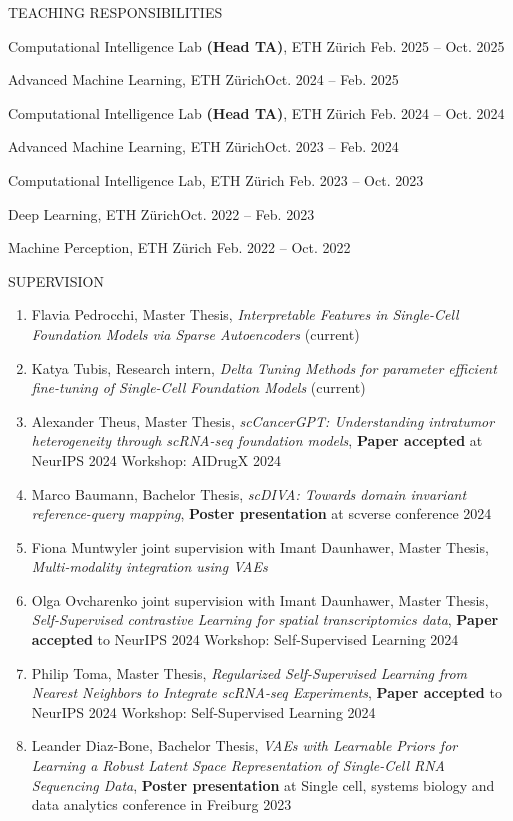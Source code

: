 \documentclass{resume} %
\begin{document}
\begin{rSection}{TEACHING RESPONSIBILITIES}
\vspace{-1.25em}
\item Computational Intelligence Lab \textbf{(Head TA)}, ETH Zürich \hfill {Feb. 2025 -- Oct. 2025}
\item Advanced Machine Learning, ETH Zürich\hfill {Oct. 2024 -- Feb. 2025}
\item Computational Intelligence Lab \textbf{(Head TA)}, ETH Zürich \hfill {Feb. 2024 -- Oct. 2024}
\item Advanced Machine Learning, ETH Zürich\hfill {Oct. 2023 -- Feb. 2024}
\item Computational Intelligence Lab, ETH Zürich \hfill {Feb. 2023 -- Oct. 2023}
\item Deep Learning, ETH Zürich\hfill {Oct. 2022 -- Feb. 2023}
\item Machine Perception, ETH Zürich \hfill {Feb. 2022 -- Oct. 2022}
\end{rSection}
\begin{rSection}{SUPERVISION}
\begin{enumerate}
    \item[2025] Flavia Pedrocchi, Master Thesis, \textit{Interpretable Features in Single-Cell Foundation Models via Sparse Autoencoders} (current)
    \item[2025] Katya Tubis, Research intern, \textit{Delta Tuning Methods for parameter efficient fine-tuning of Single-Cell Foundation Models} (current)
    \item[2024] Alexander Theus, Master Thesis, \textit{scCancerGPT: Understanding intratumor heterogeneity through scRNA-seq foundation models}, \textbf{Paper accepted} at NeurIPS 2024 Workshop: AIDrugX 2024
    \item[2024] Marco Baumann, Bachelor Thesis, \textit{scDIVA: Towards domain invariant reference-query mapping}, \textbf{Poster presentation} at scverse conference 2024
    \item[2024] Fiona Muntwyler joint supervision with Imant Daunhawer, Master Thesis, \textit{Multi-modality integration using VAEs}
    \item[2024] Olga Ovcharenko joint supervision with Imant Daunhawer, Master Thesis, \textit{Self-Supervised contrastive Learning for spatial transcriptomics data}, \textbf{Paper accepted} to NeurIPS 2024 Workshop: Self-Supervised Learning 2024
    \item[2023] Philip Toma, Master Thesis, \textit{Regularized Self-Supervised Learning from Nearest Neighbors to Integrate scRNA-seq Experiments},
    \textbf{Paper accepted} to NeurIPS 2024 Workshop: Self-Supervised Learning 2024
    \item[2023] Leander Diaz-Bone, Bachelor Thesis, \textit{VAEs with Learnable Priors for Learning a Robust Latent Space Representation of Single-Cell RNA Sequencing Data}, \textbf{Poster presentation} at Single cell, systems biology and data analytics conference in Freiburg 2023
\end{enumerate}
\end{rSection}
\end{document}
